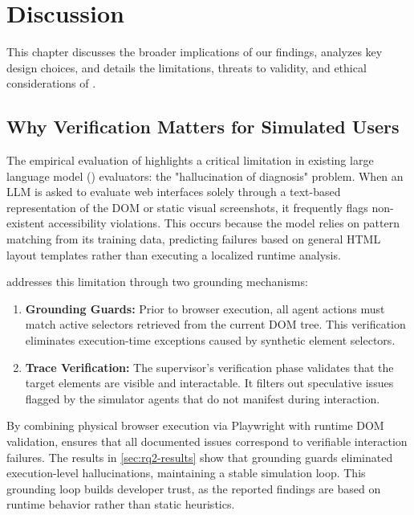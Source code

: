 \chapter{Discussion}
\label{ch:discussion}

This chapter discusses the broader implications of our findings, analyzes key design choices, and details the limitations, threats to validity, and ethical considerations of \versimux{}.


\section{Why Verification Matters for Simulated Users}
\label{sec:discuss-verification}

The empirical evaluation of \versimux{} highlights a critical limitation in existing large language model () evaluators: the "hallucination of diagnosis" problem. When an LLM is asked to evaluate web interfaces solely through a text-based representation of the DOM or static visual screenshots, it frequently flags non-existent accessibility violations. This occurs because the model relies on pattern matching from its training data, predicting failures based on general HTML layout templates rather than executing a localized runtime analysis.

\versimux{} addresses this limitation through two grounding mechanisms:
\begin{enumerate}
  \item \textbf{Grounding Guards:} Prior to browser execution, all agent actions must match active selectors retrieved from the current DOM tree. This verification eliminates execution-time exceptions caused by synthetic element selectors.
  \item \textbf{Trace Verification:} The supervisor's verification phase validates that the target elements are visible and interactable. It filters out speculative issues flagged by the simulator agents that do not manifest during interaction.
\end{enumerate}

By combining physical browser execution via Playwright with runtime DOM validation, \versimux{} ensures that all documented issues correspond to verifiable interaction failures. The results in \cref{sec:rq2-results} show that grounding guards eliminated execution-level hallucinations, maintaining a stable simulation loop. This grounding loop builds developer trust, as the reported findings are based on runtime behavior rather than static heuristics.


